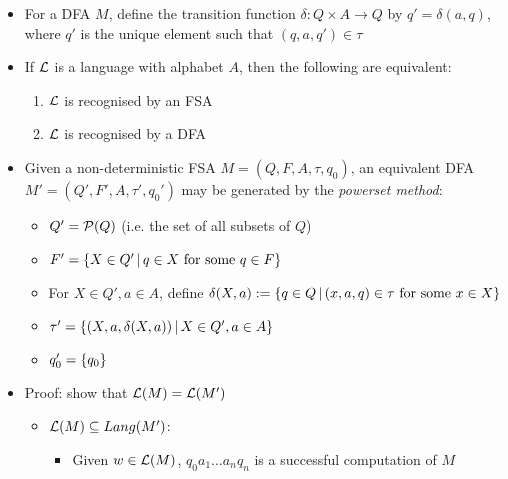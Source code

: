 \begin{itemize}
	
	\item For a DFA $ M $, define the transition function $ \delta: Q \times A \to Q $ by $ q' = \delta(a, q) $, where $ q' $ is the unique element such that $ (q, a, q') \in \tau $
	
	\item If $ \mathcal{L} $ is a language with alphabet $ A $, then the following are equivalent:
	
	\begin{enumerate}
		\item $ \mathcal{L} $ is recognised by an FSA
		
		\item $ \mathcal{L} $ is recognised by a DFA
	\end{enumerate}
	
	\item Given a non-deterministic FSA $ M = (Q, F, A, \tau, q_0) $, an equivalent DFA $ M' = (Q', F', A, \tau', q_0') $ may be generated by the \textit{powerset method}:
	
	\begin{itemize}
		
		\item $ Q' = \mathcal{P}(Q) $ (i.e. the set of all subsets of $ Q $)
		
		\item $ F' = \left\lbrace X \in Q' \, | \, q \in X \text{ for some } q \in F \right\rbrace $
		
		\item For $ X \in Q', a \in A $, define $ \delta(X, a) := \left\lbrace q \in Q \, | \, (x, a, q) \in \tau \text{ for some } x \in X \right\rbrace $
		
		\item $ \tau' = \left\lbrace (X, a, \delta(X, a)) \, | \, X \in Q', a \in A \right\rbrace $
		
		\item $ q_0' = \left\lbrace q_0 \right\rbrace $
		
	\end{itemize}

	\item Proof: show that $ \mathcal{L}(M) = \mathcal{L}(M') $
	
	\begin{itemize}
		\item $ \mathcal{L}(M) \subseteq Lang(M') $:
		
		\begin{itemize}
			\item Given $ w \in \mathcal{L}(M) $, $  q_0 a_1 \dots a_n q_n $ is a successful computation of $ M $
			

\end{itemize}
\end{itemize}
\end{itemize}
